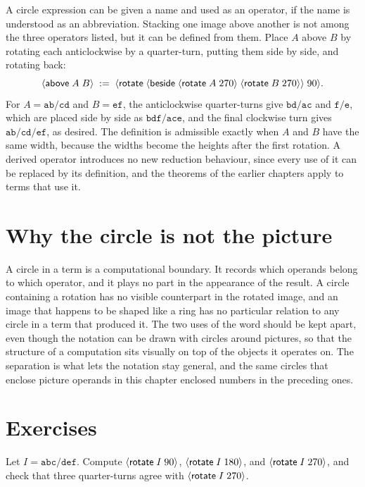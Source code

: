A circle expression can be given a name and used as an operator, if the name is understood as an abbreviation. Stacking one image above another is not among the three operators listed, but it can be defined from them. Place $A$ above $B$ by rotating each anticlockwise by a quarter-turn, putting them side by side, and rotating back:
\[
\langle \mathsf{above}\; A\; B\rangle\;:=\;\langle \mathsf{rotate}\; \langle \mathsf{beside}\; \langle \mathsf{rotate}\; A\; 270\rangle\; \langle \mathsf{rotate}\; B\; 270\rangle\rangle\; 90\rangle.
\]
For $A=\mathtt{ab/cd}$ and $B=\mathtt{ef}$, the anticlockwise quarter-turns give $\mathtt{bd/ac}$ and $\mathtt{f/e}$, which are placed side by side as $\mathtt{bdf/ace}$, and the final clockwise turn gives $\mathtt{ab/cd/ef}$, as desired. The definition is admissible exactly when $A$ and $B$ have the same width, because the widths become the heights after the first rotation. A derived operator introduces no new reduction behaviour, since every use of it can be replaced by its definition, and the theorems of the earlier chapters apply to terms that use it.

\section{Why the circle is not the picture}

A circle in a term is a computational boundary. It records which operands belong to which operator, and it plays no part in the appearance of the result. A circle containing a rotation has no visible counterpart in the rotated image, and an image that happens to be shaped like a ring has no particular relation to any circle in a term that produced it. The two uses of the word should be kept apart, even though the notation can be drawn with circles around pictures, so that the structure of a computation sits visually on top of the objects it operates on. The separation is what lets the notation stay general, and the same circles that enclose picture operands in this chapter enclosed numbers in the preceding ones.

\section*{Exercises}

\begin{exercise}[\dag]\label{ex:ch7-rotate}
Let $I=\mathtt{abc/def}$. Compute $\langle \mathsf{rotate}\; I\; 90\rangle$, $\langle \mathsf{rotate}\; I\; 180\rangle$, and $\langle \mathsf{rotate}\; I\; 270\rangle$, and check that three quarter-turns agree with $\langle \mathsf{rotate}\; I\; 270\rangle$.
\end{exercise}


